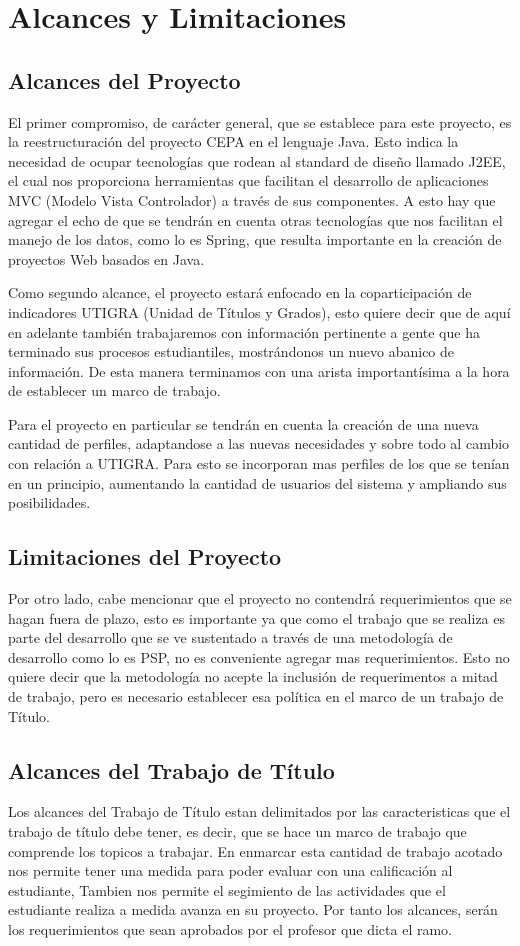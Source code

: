 \documentclass[a4paper,12pt,openany,oneside]{book}
\begin{document}
\chapter{Alcances y Limitaciones}
\thispagestyle{empty}
\section{Alcances del Proyecto}
El primer compromiso, de carácter general, que se establece para este proyecto, es la reestructuración del proyecto CEPA en el lenguaje Java. Esto indica la necesidad de ocupar tecnologías que rodean al standard de diseño llamado J2EE, el cual nos proporciona herramientas que facilitan el desarrollo de aplicaciones MVC (Modelo Vista Controlador) a través de sus componentes. A esto hay que agregar el echo de que se tendrán en cuenta otras tecnologías que nos facilitan el manejo de los datos, como lo es Spring, que resulta importante en la creación de proyectos Web basados en Java.

Como segundo alcance, el proyecto estará enfocado en la coparticipación de indicadores UTIGRA (Unidad de Títulos y Grados), esto quiere decir que de aquí en adelante también trabajaremos con información pertinente a gente que ha terminado sus procesos estudiantiles, mostrándonos un nuevo abanico de información. De esta manera terminamos con una arista importantísima a la hora de establecer un marco de trabajo.

Para el proyecto en particular se tendrán en cuenta la creación de una nueva cantidad de perfiles, adaptandose a las nuevas necesidades y sobre todo al cambio con relación a UTIGRA. Para esto se incorporan mas perfiles de los que se tenían en un principio, aumentando la cantidad de usuarios del sistema y ampliando sus posibilidades.
\section{Limitaciones del Proyecto}
Por otro lado, cabe mencionar que el proyecto no contendrá requerimientos que se hagan fuera de plazo, esto es importante ya que como el trabajo que se realiza es parte del desarrollo que se ve sustentado a través de una metodología de desarrollo como lo es PSP, no es conveniente agregar mas requerimientos. Esto no quiere decir que la metodología no acepte la inclusión de requerimentos a mitad de trabajo, pero es necesario establecer esa política en el marco de un trabajo de Título.
\section{Alcances del Trabajo de Título}
Los alcances del Trabajo de Título estan delimitados por las caracteristicas que el trabajo de título debe tener, es decir, que se hace un marco de trabajo que comprende los topicos a trabajar. En enmarcar esta cantidad de trabajo acotado nos permite tener una medida para poder evaluar con una calificación al estudiante, Tambien nos permite el segimiento de las actividades que el estudiante realiza a medida avanza en su proyecto. Por tanto los alcances, serán los requerimientos que sean aprobados por el profesor que dicta el ramo.
\end{document}
